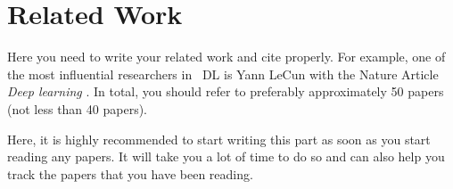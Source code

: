 \chapter{Related Work}
\label{cp:RelatedWork}


Here you need to write your related work and cite properly. For example, one of the most influential researchers in ~\ac{DL} is Yann LeCun with the Nature Article \textit{Deep learning} \cite{lecun2015deep}. In total, you should refer to preferably approximately 50 papers (not less than 40 papers).

Here, it is highly recommended to start writing this part as soon as you start reading any papers. It will take you a lot of time to do so and can also help you track the papers that you have been reading.



 